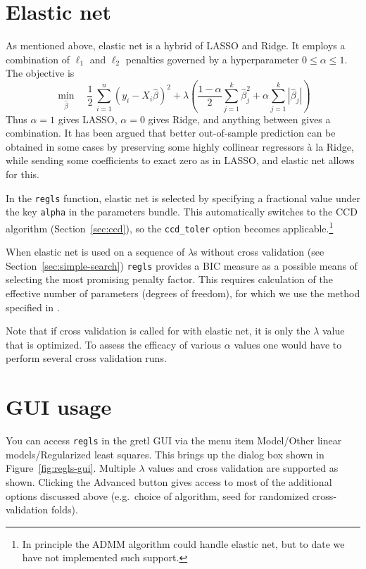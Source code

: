 \documentclass{article}
\begin{document}
\section{Elastic net}
\label{sec:elnet}

As mentioned above, elastic net is a hybrid of LASSO and Ridge. It
employs a combination of $\ell_1$ and $\ell_2$ penalties governed by a
hyperparameter $0 \leq \alpha \leq 1$. The objective is
\[
    \min_{\hat{\beta}} \quad \frac{1}{2}\,
    \sum_{i=1}^n (y_i - X_i\hat{\beta})^2 +
    \lambda \left(\frac{1-\alpha}{2} \sum_{j=1}^k \hat{\beta}_j^2
      + \alpha \sum_{j=1}^k |\hat{\beta}_j|\right)
  \]
Thus $\alpha = 1$ gives LASSO, $\alpha = 0$ gives Ridge, and anything
between gives a combination. It has been argued that better
out-of-sample prediction can be obtained in some cases by preserving
some highly collinear regressors \`a la Ridge, while sending some
coefficients to exact zero as in LASSO, and elastic net allows for
this.

In the \texttt{regls} function, elastic net is selected by specifying
a fractional value under the key \texttt{alpha} in the parameters
bundle. This automatically switches to the CCD algorithm
(Section~\ref{sec:ccd}), so the \texttt{ccd\_toler} option becomes
applicable.\footnote{In principle the ADMM algorithm could handle
  elastic net, but to date we have not implemented such support.}

When elastic net is used on a sequence of $\lambda$s without cross
validation (see Section~\ref{sec:simple-search}) \texttt{regls}
provides a BIC measure as a possible means of selecting the most
promising penalty factor. This requires calculation of the effective
number of parameters (degrees of freedom), for which we use the method
specified in \cite{zou-hastie05}.

Note that if cross validation is called for with elastic net, it is
only the $\lambda$ value that is optimized. To assess the efficacy of
various $\alpha$ values one would have to perform several cross
validation runs.

\section{GUI usage}

You can access \texttt{regls} in the gretl GUI via the menu item
\textsf{Model/Other linear models/Regularized least squares}. This
brings up the dialog box shown in Figure~\ref{fig:regls-gui}. Multiple
$\lambda$ values and cross validation are supported as shown. Clicking
the \textsf{Advanced} button gives access to most of the additional
options discussed above (e.g.\ choice of algorithm, seed for
randomized cross-validation folds). 
\end{document}
